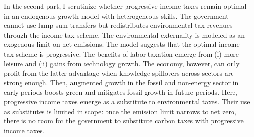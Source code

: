 In the second part, I scrutinize whether progressive income taxes remain optimal in an endogenous growth model with heterogeneous skills. The government cannot use lump-sum transfers but redistributes environmental tax revenues through the income tax scheme. The environmental externality is modeled as an exogenous limit on net emissions. 
 The model suggests that the optimal income tax scheme is progressive. The benefits of labor taxation emerge from (i) more leisure and (ii) gains from technology growth.
 The economy, however, can only profit from the latter advantage when knowledge spillovers across sectors are strong enough. Then, augmented growth in the fossil and non-energy sector in early periods boosts green and mitigates fossil growth in future periods. Here, progressive income taxes emerge as a substitute to environmental taxes. Their use as substitutes is limited in scope: once the emission limit narrows to net zero, there is no room for the government to substitute carbon taxes with progressive income taxes.
 
% 
 
 

